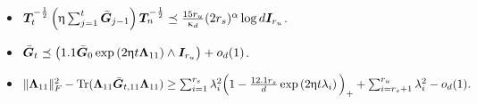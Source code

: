 \begin{proposition}
\begin{itemize}[leftmargin = *]
\begin{itemize}
\item  $\boldsymbol{T}_t^{- \frac{1}{2}} \left( \upeta \sum_{j = 1}^t \bar{\boldsymbol{G}}_{j - 1} \right) \boldsymbol{T}_n^{- \frac{1}{2}} \preceq \frac{15 r_u}{\upkappa_d} (2 r_s)^{\alpha} \log d \boldsymbol{I}_{r_u}$.
\item  $   \bar{\boldsymbol{G}}_{t}     \preceq \left(  1.1 \bar{\boldsymbol{G}}_{0}  \exp \left(  2  \upeta t  \boldsymbol{\Lambda}_{11}  \right) \wedge  \boldsymbol{I}_{r_u} \right) +    o_d(1)$.
\item $\lVert \boldsymbol{\Lambda}_{11}\rVert_F^2  - \text{Tr}(\boldsymbol{\Lambda}_{11} \bar{\boldsymbol{G}}_{t,11} \boldsymbol{\Lambda}_{11} ) \geq   \sum_{i = 1}^{r_s}  \lambda_i^2 \Big(  1 - \tfrac{12.1  r_s}{d}   \exp \left(  2  \upeta t  \lambda_i \right)   \Big)_{+}  +   \sum_{i = r_s + 1}^{r_u}  \lambda_i^2  -   o_d(1).$  
\end{itemize}
\end{itemize}
\end{proposition}


